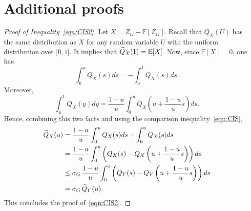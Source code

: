 \documentclass[10pt]{amsart}
\theoremstyle{definition}\newtheorem{defi}[theo]{Definition}\newtheorem{rema}[theo]{Remark}\newtheorem{exam}[theo]{Example}\newtheorem{exem}[theo]{Example}\newtheorem{nota}[theo]{Notation}
\newcommand{\bE}{\mathbb{E}}
\newcommand{\intervalleff}[2]{\mathopen{[} #1\mathclose{}\mathpunct{},#2\mathclose{]}}
\let\oldtilde\tilde
\renewcommand*{\tilde}[1]{\mathchoice{\widetilde{#1}}{\widetilde{#1}}{\oldtilde{#1}}{\oldtilde{#1}}}
\begin{document}
\appendix
\section{Additional proofs}\label{section:Appendix A}

\begin{proof}[Proof of Inequality~\eqref{eqn:CIS2}]
Let $X=Z_G-\bE[Z_G]$. Recall that $Q_X(U)$ has the same distribution as $X$ for any random variable $U$ with the uniform distribution over $\intervalleff 01$. It implies that $\tilde Q_X(1)=\bE[X]$. Now, since $\bE[X]=0$, one has
\[
\int_0^uQ_X(s)ds=-\int_u^1Q_X(s)ds.
\]
Moreover,
\[
\int_u^1 Q_X(y)dy=\frac{1-u}{u}\int_0^uQ_X\left(u+\frac{1-u}{u}s\right)ds.
\]
Hence, combining this two facts and using the comparison inequality~\eqref{eqn:CIS},
\begin{align*}
\tilde Q_X(u) &=\frac{1-u}{u}\int_0^uQ_X(s)ds+\int_0^uQ_X(s)ds\\
&=\frac{1-u}{u}\int_0^u \left(Q_X(s)-Q_X\left(u+\frac{1-u}{u}s\right)\right)ds\\
&\leq \sigma_G\,\frac{1-u}{u}\int_0^u \left(Q_Y(s)-Q_Y\left(u+\frac{1-u}{u}s\right)\right)ds\\
&= \sigma_G\,\tilde Q_Y(u).
\end{align*}
This concludes the proof of~\eqref{eqn:CIS2}.
\end{proof}
\end{document}

